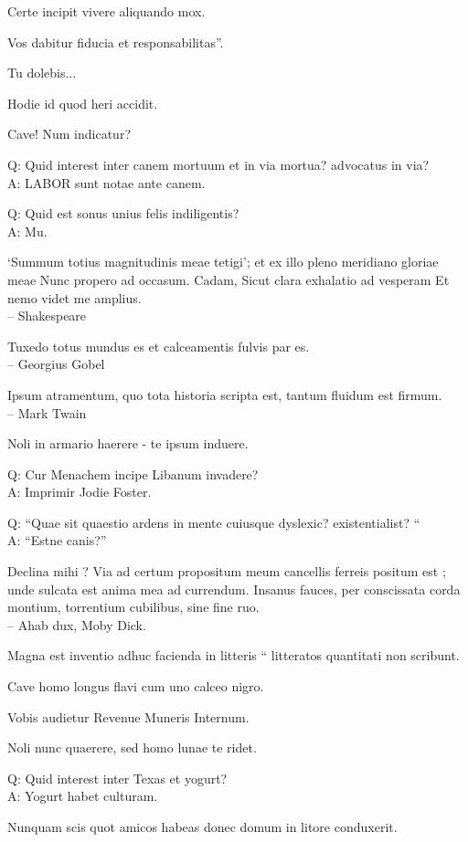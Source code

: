 \documentclass[titlepage,12pt]{memoir}
\begin{document}
Certe incipit vivere aliquando mox.

Vos dabitur fiducia et responsabilitas”.

Tu dolebis...

Hodie id quod heri accidit.

Cave! Num indicatur?

Q: Quid interest inter canem mortuum et in via mortua?
advocatus in via?\\
A: LABOR sunt notae ante canem.

Q: Quid est sonus unius felis indiligentis?\\
A: Mu.

‘Summum totius magnitudinis meae tetigi’;
et ex illo pleno meridiano gloriae meae
Nunc propero ad occasum. Cadam,
Sicut clara exhalatio ad vesperam
Et nemo videt me amplius.
\\-- Shakespeare

Tuxedo totus mundus es et calceamentis fulvis par es.
\\-- Georgius Gobel

Ipsum atramentum, quo tota historia scripta est, tantum fluidum est firmum.
\\-- Mark Twain

Noli in armario haerere - te ipsum induere.

Q: Cur Menachem incipe Libanum invadere?\\
A: Imprimir Jodie Foster.

Q: “Quae sit quaestio ardens in mente cuiusque dyslexic?
existentialist? “\\
A: “Estne canis?”

 Declina mihi ? Via ad certum propositum meum cancellis ferreis positum est ;
unde sulcata est anima mea ad currendum. Insanus fauces, per
conscissata corda montium, torrentium cubilibus, sine fine ruo.
\\-- Ahab dux, Moby Dick.

 Magna est inventio adhuc facienda in litteris “
litteratos quantitati non scribunt.

Cave homo longus flavi cum uno calceo nigro.

Vobis audietur Revenue Muneris Internum.

Noli nunc quaerere, sed homo lunae te ridet.

Q: Quid interest inter Texas et yogurt?\\
A: Yogurt habet culturam.

Nunquam scis quot amicos habeas donec domum in litore conduxerit.
\end{document}
